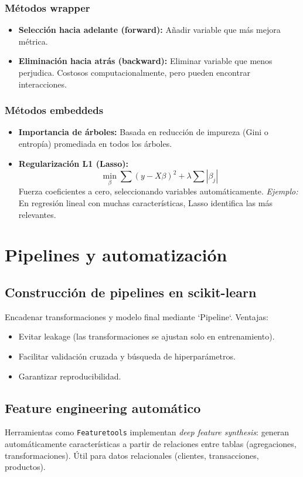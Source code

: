 \documentclass[12pt,a4paper,openany,oneside]{book}
\begin{document}
\subsubsection{Métodos wrapper}
\begin{itemize}
    \item \textbf{Selección hacia adelante (forward):} Añadir variable que más mejora métrica.
    \item \textbf{Eliminación hacia atrás (backward):} Eliminar variable que menos perjudica.
    Costosos computacionalmente, pero pueden encontrar interacciones.
\end{itemize}

\subsubsection{Métodos embeddeds}
\begin{itemize}
    \item \textbf{Importancia de árboles:} Basada en reducción de impureza (Gini o entropía) promediada en todos los árboles.
    \item \textbf{Regularización L1 (Lasso):}
    \[
    \min_{\beta} \sum (y - X\beta)^2 + \lambda \sum |\beta_j|
    \]
    Fuerza coeficientes a cero, seleccionando variables automáticamente. \textit{Ejemplo:} En regresión lineal con muchas características, Lasso identifica las más relevantes.
\end{itemize}

\section{Pipelines y automatización}

\subsection{Construcción de pipelines en scikit-learn}
Encadenar transformaciones y modelo final mediante `Pipeline`. Ventajas:
\begin{itemize}
    \item Evitar leakage (las transformaciones se ajustan solo en entrenamiento).
    \item Facilitar validación cruzada y búsqueda de hiperparámetros.
    \item Garantizar reproducibilidad.
\end{itemize}

\subsection{Feature engineering automático}
Herramientas como \texttt{Featuretools} implementan \textit{deep feature synthesis}: generan automáticamente características a partir de relaciones entre tablas (agregaciones, transformaciones). Útil para datos relacionales (clientes, transacciones, productos).
\end{document}
